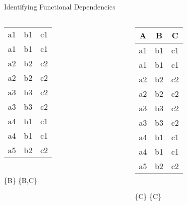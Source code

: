 \begin{frame}{Identifying Functional Dependencies}
\begin{columns}
\begin{column}{0.32\textwidth}
\begin{table}[t]
\begin{tabular}{ccc}
a1 & b1 & c1 \\
\rowcolor{Dandelion}
a1 & b1 & c1 \\
\rowcolor{lightgray}
a2 & b2 & c2 \\
\rowcolor{lightgray}
a2 & b2 & c2 \\
\rowcolor{Thistle}
a3 & b3 & c2 \\
\rowcolor{Thistle}
a3 & b3 & c2 \\
\rowcolor{Dandelion}
a4 & b1 & c1 \\
\rowcolor{Dandelion}
a4 & b1 & c1 \\
\rowcolor{lightgray}
a5 & b2 & c2 \\
\bottomrule
\end{tabular}\\
\pause
\{\alert{B}\} \rightarrow \{B,C\}
\end{table}
    \end{column}
    \pause
    \begin{column}{0.32\textwidth}
        \begin{table}[t]
\centering
\begin{tabular}{ccc}
\toprule
\textbf{A} & \textbf{B} & \textbf{\alert{C}} \\
\toprule
\rowcolor{Dandelion}
a1 & b1 & c1 \\
\rowcolor{Dandelion}
a1 & b1 & c1 \\
\rowcolor{lightgray}
a2 & b2 & c2 \\
\rowcolor{lightgray}
a2 & b2 & c2 \\
\rowcolor{lightgray}
a3 & b3 & c2 \\
\rowcolor{lightgray}
a3 & b3 & c2 \\
\rowcolor{Dandelion}
a4 & b1 & c1 \\
\rowcolor{Dandelion}
a4 & b1 & c1 \\
\rowcolor{lightgray}
a5 & b2 & c2 \\
\bottomrule
\end{tabular}\\
\pause
\{\alert{C}\} \rightarrow \{C\}
\end{table}
    \end{column}
\end{columns}
\end{frame}